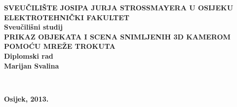 \newpage
\begin{titlepage}
\begin{center}
\newcommand{\HRule}[1]{\rule{\linewidth}{#1}}

\textbf{\MakeUppercase{\large Sveučilište Josipa Jurja Strossmayera u Osijeku}}\\[0.2cm]
\textbf{\MakeUppercase{\large Elektrotehnički fakultet}}\\[0.8cm]
\textbf{\large Sveučilišni studij}\\ [5cm]


\textbf{\MakeUppercase{\Large Prikaz objekata i scena snimljenih 3D
kamerom pomoću mreže trokuta}}\\ [1cm]
\textbf{\large Diplomski rad}\\  [5 cm] 

\textbf{\Large Marijan Svalina}\\ [0.5cm] 



\vfill
\begin{minipage}{0.4\textwidth}
\begin{flushleft} \large

\textsc\\

\end{flushleft}
\end{minipage}

\begin{minipage}{0.4\textwidth}

\begin{center} \large
\textbf{\large Osijek, 2013.} \\

\end{center}


\end{minipage}
\end{center}
\end{titlepage}
